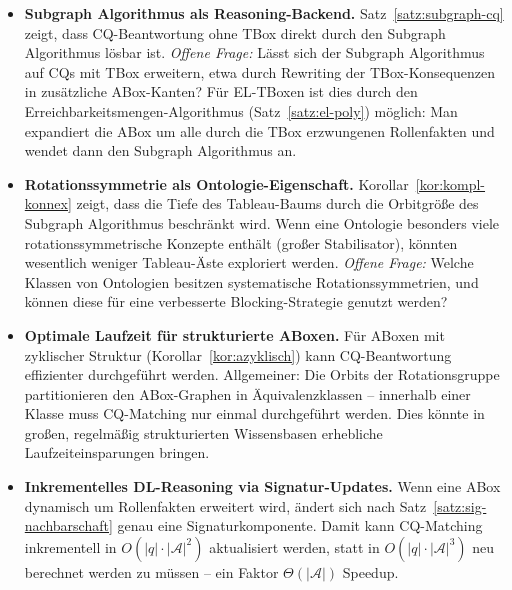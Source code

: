﻿\documentclass[a4paper,12pt]{article}
\theoremstyle{definition}
\theoremstyle{plain}
\theoremstyle{remark}
\newcommand{\Abox}{\ensuremath{\mathcal{A}}}
\begin{document}
\begin{itemize}
  \item \textbf{Subgraph Algorithmus als Reasoning-Backend.}
        Satz~\ref{satz:subgraph-cq} zeigt, dass CQ-Beantwortung
        ohne TBox direkt durch den Subgraph Algorithmus l{\"o}sbar ist.
        \emph{Offene Frage:} L{\"a}sst sich der Subgraph Algorithmus
        auf CQs mit TBox erweitern, etwa durch Rewriting der
        TBox-Konsequenzen in zus{\"a}tzliche ABox-Kanten?
        F{\"u}r \textsf{EL}-TBoxen ist dies durch den
        Erreichbarkeitsmengen-Algorithmus (Satz~\ref{satz:el-poly})
        m{\"o}glich: Man expandiert die ABox um alle
        durch die TBox erzwungenen Rollenfakten und wendet
        dann den Subgraph Algorithmus an.

  \item \textbf{Rotationssymmetrie als Ontologie-Eigenschaft.}
        Korollar~\ref{kor:kompl-konnex} zeigt, dass die Tiefe
        des Tableau-Baums durch die Orbitgr{\"o}{\ss}e des Subgraph Algorithmus
        beschr{\"a}nkt wird. Wenn eine Ontologie besonders viele
        rotationssymmetrische Konzepte enth{\"a}lt (gro{\ss}er Stabilisator),
        k{\"o}nnten wesentlich weniger Tableau-{\"A}ste exploriert werden.
        \emph{Offene Frage:} Welche Klassen von Ontologien besitzen
        systematische Rotationssymmetrien, und k{\"o}nnen diese
        f{\"u}r eine verbesserte Blocking-Strategie genutzt werden?

  \item \textbf{Optimale Laufzeit f{\"u}r strukturierte ABoxen.}
        F{\"u}r ABoxen mit zyklischer Struktur (Korollar~\ref{kor:azyklisch})
        kann CQ-Beantwortung effizienter durchgef{\"u}hrt werden.
        Allgemeiner: Die Orbits der Rotationsgruppe partitionieren
        den ABox-Graphen in {\"A}quivalenzklassen -- innerhalb einer
        Klasse muss CQ-Matching nur einmal durchgef{\"u}hrt werden.
        Dies k{\"o}nnte in gro{\ss}en, regelm{\"a}{\ss}ig strukturierten
        Wissensbasen erhebliche Laufzeiteinsparungen bringen.

  \item \textbf{Inkrementelles DL-Reasoning via Signatur-Updates.}
        Wenn eine ABox dynamisch um Rollenfakten erweitert wird,
        {\"a}ndert sich nach Satz~\ref{satz:sig-nachbarschaft}
        genau eine Signaturkomponente. Damit kann CQ-Matching
        inkrementell in $O(|q| \cdot |\Abox|^2)$ aktualisiert werden,
        statt in $O(|q| \cdot |\Abox|^3)$ neu berechnet werden zu m{\"u}ssen --
        ein Faktor $\Theta(|\Abox|)$ Speedup.
\end{itemize}
\end{document}
